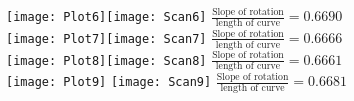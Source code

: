 \documentclass[11pt]{article}
\begin{document}
\newpage
\begin{figure}
\texttt{[image: Plot6]}\hspace{-.5cm}\texttt{[image: Scan6]} $\frac{\text{Slope of rotation}}{\text{length of curve}}= 0.6690$\\
\texttt{[image: Plot7]}\hspace{-.5cm}\texttt{[image: Scan7]} $\frac{\text{Slope of rotation}}{\text{length of curve}}= 0.6666$\\
\texttt{[image: Plot8]}\hspace{-.5cm}\texttt{[image: Scan8]} $\frac{\text{Slope of rotation}}{\text{length of curve}}= 0.6661$\\
\texttt{[image: Plot9]} \hspace{-.5cm}\texttt{[image: Scan9]} $\frac{\text{Slope of rotation}}{\text{length of curve}}= 0.6681$
\end{figure}
\end{document}
